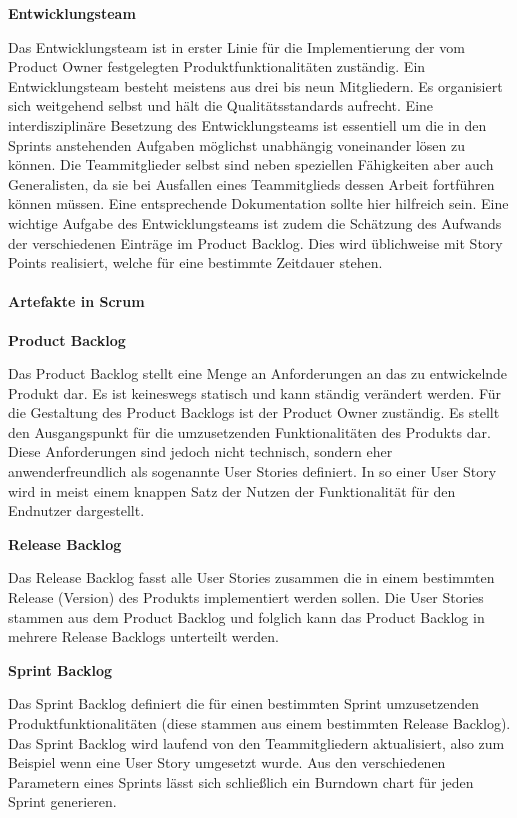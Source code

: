 \textbf{Entwicklungsteam}

Das Entwicklungsteam ist in erster Linie für die Implementierung der vom Product Owner festgelegten Produktfunktionalitäten zuständig. Ein Entwicklungsteam besteht meistens aus drei bis neun Mitgliedern. Es organisiert sich weitgehend selbst und hält die Qualitätsstandards aufrecht. Eine interdisziplinäre Besetzung des Entwicklungsteams ist essentiell um die in den Sprints anstehenden Aufgaben möglichst unabhängig voneinander lösen zu können. Die Teammitglieder selbst sind neben speziellen Fähigkeiten aber auch Generalisten, da sie bei Ausfallen eines Teammitglieds dessen Arbeit fortführen können müssen. Eine entsprechende Dokumentation sollte hier hilfreich sein. Eine wichtige Aufgabe des Entwicklungsteams ist zudem die Schätzung des Aufwands der verschiedenen Einträge im Product Backlog. Dies wird üblichweise mit Story Points realisiert, welche für eine bestimmte Zeitdauer stehen.

\paragraph{Artefakte in Scrum}
\textbf{Product Backlog}

Das Product Backlog stellt eine Menge an Anforderungen an das zu entwickelnde Produkt dar. Es ist keineswegs statisch und kann ständig verändert werden. Für die Gestaltung des Product Backlogs ist der Product Owner zuständig. Es stellt den Ausgangspunkt für die umzusetzenden Funktionalitäten des Produkts dar. Diese Anforderungen sind jedoch nicht technisch, sondern eher anwenderfreundlich als sogenannte User Stories definiert. In so einer User Story wird in meist einem knappen Satz der Nutzen der Funktionalität für den Endnutzer dargestellt.

\textbf{Release Backlog}

Das Release Backlog fasst alle User Stories zusammen die in einem bestimmten Release (Version) des Produkts implementiert werden sollen. Die User Stories stammen aus dem Product Backlog und folglich kann das Product Backlog in mehrere Release Backlogs unterteilt werden.

\textbf{Sprint Backlog}

Das Sprint Backlog definiert die für einen bestimmten Sprint umzusetzenden Produktfunktionalitäten (diese stammen aus einem bestimmten Release Backlog). Das Sprint Backlog wird laufend von den Teammitgliedern aktualisiert, also zum Beispiel wenn eine User Story umgesetzt wurde. Aus den verschiedenen Parametern eines Sprints lässt sich schließlich ein Burndown chart für jeden Sprint generieren.

